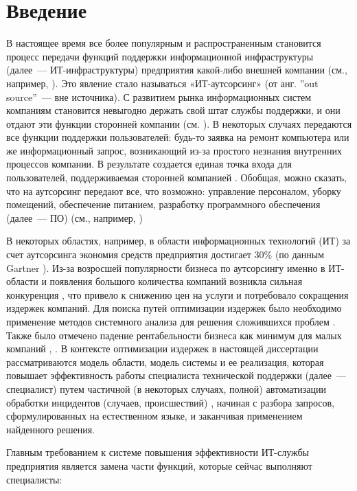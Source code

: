 \chapter*{Введение}							%

В настоящее время все более популярным и распространенным становится процесс передачи функций поддержки информационной инфраструктуры (далее~--- ИТ-инфраструктуры) предприятия какой-либо внешней компании (см., например, \cite{StartToOutsource}). Это явление стало называться «ИТ-аутсорсинг» (от анг. ”out source”~--– вне источника). С развитием рынка информационных систем компаниям становится невыгодно держать свой штат службы поддержки, и они отдают эти функции сторонней компании (см. \cite{OutsourceEff}). В некоторых случаях передаются все функции поддержки пользователей: будь-то заявка на ремонт компьютера или же информационный запрос, возникающий из-за простого незнания внутренних процессов компании. В результате создается единая точка входа для пользователей, поддерживаемая сторонней компанией \cite{OutsourceSD}. Обобщая, можно сказать, что на аутсорсинг передают все, что возможно: управление персоналом, уборку помещений, обеспечение питанием, разработку программного обеспечения (далее~--- ПО) (см., например, \cite{OutsourceSoft}) \etc \par
В некоторых областях, например, в области информационных технологий (ИТ) за счет аутсорсинга экономия средств предприятия достигает 30\% (по данным Gartner \cite{OutsourceIT}).
Из-за возросшей популярности бизнеса по аутсорсингу именно в ИТ-области и появления большого количества компаний возникла сильная конкуренция \cite{AUTOS-1}, что привело к снижению цен на услуги и потребовало сокращения издержек компаний. Для поиска путей оптимизации издержек было необходимо применение методов системного анализа для решения сложившихся проблем \cite{AUTOM-1}. Также было отмечено падение рентабельности бизнеса как минимум для малых компаний \cite{OUTSOURCE-RENT}, \cite{OutsourceEff}. В контексте оптимизации издержек в настоящей диссертации рассматриваются модель области, модель системы и ее реализация, которая повышает эффективность работы специалиста технической поддержки (далее~--- специалист) путем частичной (в некоторых случаях, полной) автоматизации обработки инцидентов (случаев, происшествий)  \cite{SDAUTOM}, начиная с разбора запросов, сформулированных на естественном языке, и заканчивая применением найденного решения. \par
Главным требованием к системе повышения эффективности ИТ-службы предприятия является замена части функций, которые сейчас выполняют специалисты:
